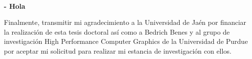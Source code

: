\newpage
\begin{flushright}
	\textit{\lipsum[1-1]}\\
    \textbf{- Hola}
\end{flushright}


\normalsize
\libertineNormal

\lipsum[1-5]

Finalmente, transmitir mi agradecimiento a la Universidad de Jaén por financiar la realización de esta tesis doctoral así como a Bedrich Benes y al grupo de investigación High Performance Computer Graphics de la Universidad de Purdue por aceptar mi solicitud para realizar mi estancia de investigación con ellos.